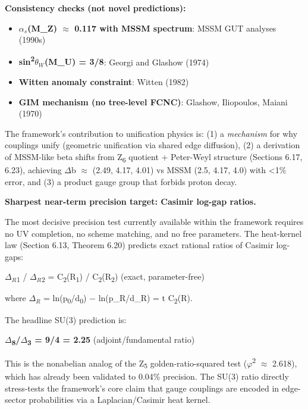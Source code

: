 \documentclass[11pt,a4paper]{article}
\theoremstyle{remark}
\providecommand{\tightlist}{%
  \setlength{\itemsep}{0pt}\setlength{\parskip}{0pt}}
\begin{document}
\textbf{Consistency checks (not novel predictions):}

\begin{itemize}
\tightlist
\item
  \textbf{\(\alpha_s\)(M\_Z) \ensuremath{\approx} 0.117 with MSSM spectrum}: MSSM GUT analyses (1990s)
\item
  \textbf{sin\textsuperscript{2}\(\theta_W\)(M\_U) = 3/8}: Georgi and Glashow (1974)
\item
  \textbf{Witten anomaly constraint}: Witten (1982)
\item
  \textbf{GIM mechanism (no tree-level FCNC)}: Glashow, Iliopoulos, Maiani (1970)
\end{itemize}

The framework's contribution to unification physics is: (1) a \emph{mechanism} for
why couplings unify (geometric unification via shared edge diffusion), (2) a
derivation of MSSM-like beta shifts from Z\textsubscript{6} quotient + Peter-Weyl structure
(Sections 6.17, 6.23), achieving \ensuremath{\Delta}b \ensuremath{\approx} (2.49, 4.17, 4.01) vs MSSM (2.5, 4.17, 4.0)
with \textless1\% error, and (3) a product gauge group that forbids proton decay.

\textbf{Sharpest near-term precision target: Casimir log-gap ratios.}

The most decisive precision test currently available within the framework requires no UV completion, no scheme matching, and no free parameters. The heat-kernel law (Section 6.13, Theorem 6.20) predicts exact rational ratios of Casimir log-gaps:

\(\Delta_R\)\textsubscript{1} / \(\Delta_R\)\textsubscript{2} = C\textsubscript{2}(R\textsubscript{1}) / C\textsubscript{2}(R\textsubscript{2}) (exact, parameter-free)

where \(\Delta_R\) = ln(p\textsubscript{0}/d\textsubscript{0}) \ensuremath{-} ln(p\_R/d\_R) = t C\textsubscript{2}(R).

The headline SU(3) prediction is:

\textbf{\ensuremath{\Delta}\textsubscript{8}/\ensuremath{\Delta}\textsubscript{3} = 9/4 = 2.25} (adjoint/fundamental ratio)

This is the nonabelian analog of the Z\textsubscript{5} golden-ratio-squared test
(\ensuremath{\varphi}\textsuperscript{2} \ensuremath{\approx} 2.618), which has already been validated to 0.04\% precision.
The SU(3) ratio directly stress-tests the framework's core claim that gauge
couplings are encoded in edge-sector probabilities via a Laplacian/Casimir
heat kernel.
\end{document}
